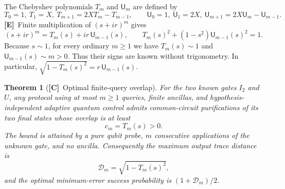 \documentclass[11pt,oneside]{article}
\numberwithin{equation}{section}
\theoremstyle{plain}
\newtheorem{theorem}{Theorem}[section]
\theoremstyle{definition}
\theoremstyle{remark}
\newcommand{\TD}{\mathcal D}
\newcommand{\TE}{\textcolor{TierE}{\textsf{\bfseries[E]}}}
\newcommand{\TC}{\textcolor{TierC}{\textsf{\bfseries[C]}}}
\begin{document}
The Chebyshev polynomials $T_m$ and $\mathsf U_m$ are defined by
\[
 T_0=1,\ T_1=X,\ T_{m+1}=2XT_m-T_{m-1},\qquad
 \mathsf U_0=1,\ \mathsf U_1=2X,\
 \mathsf U_{m+1}=2X\mathsf U_m-\mathsf U_{m-1}.
\]
\TE\ Finite multiplication of $(s+ir)^m$ gives
\begin{equation}\label{qgs:hol:eq:cheby}
 (s+ir)^m=T_m(s)+ir\,\mathsf U_{m-1}(s),\qquad
 T_m(s)^2+(1-s^2)\mathsf U_{m-1}(s)^2=1.
\end{equation}
Because $s\sim1$, for every ordinary $m\geq1$ we have $T_m(s)\sim1$ and $\mathsf U_{m-1}(s)\sim m>0$. Thus their signs are known without trigonometry. In particular, $\sqrt{1-T_m(s)^2}=r\,\mathsf U_{m-1}(s)$.

\begin{theorem}[\TC\ Optimal finite-query overlap]\label{qgs:hol:thm:query}
For the two known gates $I_2$ and $U$, any protocol using at most $m\geq1$ queries, finite ancillas, and hypothesis-independent adaptive quantum control admits common-circuit purifications of its two final states whose overlap is at least
\[
 c_m=T_m(s)>0.
\]
The bound is attained by a pure qubit probe, $m$ consecutive applications of the unknown gate, and no ancilla. Consequently the maximum output trace distance is
\begin{equation}\label{qgs:hol:eq:Dm}
 \TD_m=\sqrt{1-T_m(s)^2},
\end{equation}
and the optimal minimum-error success probability is $(1+\TD_m)/2$.
\end{theorem}
\end{document}
